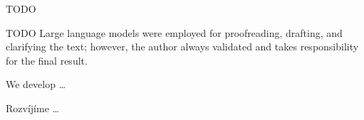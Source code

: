 \begin{thanks}
	TODO %
\end{thanks}

\begin{declaration}
	TODO %
	Large language models were employed for proofreading, drafting, and clarifying the text; however, the author always validated and takes responsibility for the final result.
\end{declaration}

\begin{abstract-english}
We develop \ldots
\end{abstract-english}

\begin{abstract-czech}
Rozvíjíme \ldots
\end{abstract-czech}
